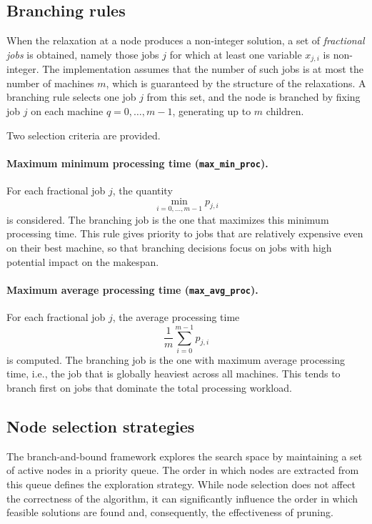 \subsection{Branching rules}
\label{subsec:branching-rules}

When the relaxation at a node produces a non-integer solution, a set of \emph{fractional jobs} is obtained, namely those jobs \(j\) for which at least one variable \(x_{j,i}\) is non-integer.
The implementation assumes that the number of such jobs is at most the number of machines \(m\), which is guaranteed by the structure of the relaxations.
A branching rule selects one job \(j\) from this set, and the node is branched by fixing job \(j\) on each machine \(q = 0,\dots,m-1\), generating up to \(m\) children.

Two selection criteria are provided.

\paragraph{Maximum minimum processing time (\texttt{max\_min\_proc}).}
For each fractional job \(j\), the quantity
\[
    \min_{i = 0,\dots,m-1} p_{j,i}
\]
is considered.
The branching job is the one that maximizes this minimum processing time.
This rule gives priority to jobs that are relatively expensive even on their best machine, so that branching decisions focus on jobs with high potential impact on the makespan.

\paragraph{Maximum average processing time (\texttt{max\_avg\_proc}).}
For each fractional job \(j\), the average processing time
\[
    \frac{1}{m} \sum_{i=0}^{m-1} p_{j,i}
\]
is computed.
The branching job is the one with maximum average processing time, i.e., the job that is globally heaviest across all machines.
This tends to branch first on jobs that dominate the total processing workload.

\subsection{Node selection strategies}
\label{subsec:node-selection}

The branch-and-bound framework explores the search space by maintaining a set of active nodes in a priority queue.
The order in which nodes are extracted from this queue defines the exploration strategy.
While node selection does not affect the correctness of the algorithm, it can significantly influence the order in which feasible solutions are found and, consequently, the effectiveness of pruning.

